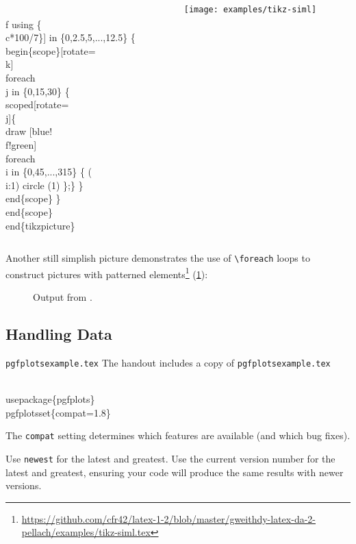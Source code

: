{\begin{frame}
\begin{columns}
\begin{column}{.75\linewidth}
\begin{semiverbatim}
    \\f using \{\\c*100/7\}] in 
    \{0,2.5,5,...,12.5\}
    \{\\begin\{scope\}[rotate=\alert{\\k}]
      \alert{\\foreach \\j} in \{0,15,30\}
        \{\\scoped[rotate=\alert{\\j}]\{\\draw [blue!\\f!green] \alert{\\foreach 
          \\i} in \{0,45,...,315\} \{ (\alert{\\i}:1) circle (1) \};\} \}
      \\end\{scope\} \}
  \\end\{scope\}
\\end\{tikzpicture\}
\end{semiverbatim}
    \end{column}
    \begin{column}{.25\linewidth}
      \vspace*{2\baselineskip}
      \texttt{[image: examples/tikz-siml]}
    \end{column}
  \end{columns}
\end{frame}
Another still simplish \Tikz{} picture demonstrates the use of \verb|\foreach| loops to construct pictures with patterned elements\footnote{\url{https://github.com/cfr42/latex-1-2/blob/master/gweithdy-latex-da-2-pellach/examples/tikz-siml.tex}} (\cref{fig:tikz-siml}):
\begin{figure}
  \centering
  
  \caption{Output from .}\label{fig:tikz-siml}
\end{figure}
%
}




\subsection{Handling Data}

\begin{frame}[fragile]{\texttt{pgfplotsexample.tex}}
  The handout includes a copy of \texttt{pgfplotsexample.tex}
  \begin{semiverbatim}
    \\usepackage\{pgfplots\}
    \alert<2>{\\pgfplotsset\{compat=1.8\}}
  \end{semiverbatim}
  The \verb|compat| setting determines which features are available (and which bug fixes).

  Use \verb|newest| for the latest and greatest.
%
  Use the current version number for the latest and greatest, ensuring your code will produce the same results with newer versions.
\end{frame}


